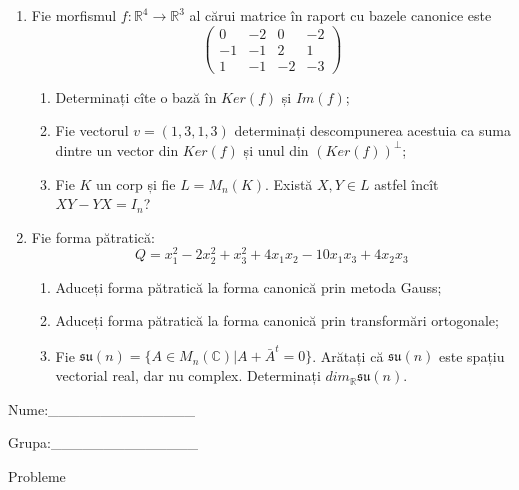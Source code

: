 \documentclass{article}
\begin{document}
\begin{enumerate}
 \item Fie morfismul $f:\mathbb{R}^4 \to \mathbb{R}^3$ al cărui matrice în raport cu bazele canonice este
$$\begin{pmatrix}
0&-2&0&-2\\
-1&-1&2&1\\
1&-1&-2&-3
\end{pmatrix}$$

\begin{enumerate}
\item Determinați cîte o bază în $Ker(f)$ și $Im(f)$;
\item Fie vectorul $v=(1,3,1,3)$ determinați descompunerea acestuia ca suma dintre un vector din $Ker(f)$ și unul din $(Ker(f))^\perp$;
\item Fie $K$ un corp și fie $L=M_n(K)$. Există $X,Y \in L$ astfel încît $XY-YX=I_n$?  
\end{enumerate}
\item Fie forma pătratică:
$$Q= x_1^2-2x_2^2+x_3^2+4x_1x_2-10x_1x_3+4x_2x_3$$

\begin{enumerate}
\item Aduceți forma pătratică la forma canonică prin metoda Gauss;
\item Aduceți forma pătratică la forma canonică prin transformări ortogonale;
\item Fie $\mathfrak{su}(n)=\{ A \in M_n(\mathbb{C}) | A+\bar{A}^t=0\}$. Arătați că $\mathfrak{su}(n)$ este spațiu vectorial real, dar nu complex.
Determinați $dim_{\mathbb{R}}\mathfrak{su}(n)$.
\end{enumerate}
\end{enumerate}
\newpage
\begin{flushright}
Nume:\_\_\_\_\_\_\_\_\_\_\_\_\_\_
 
 
Grupa:\_\_\_\_\_\_\_\_\_\_\_\_\_\_
\end{flushright}
\begin{center}
\vspace{2cm}
{\Large Probleme}
\vspace{2cm}
\end{center}
\end{document}
